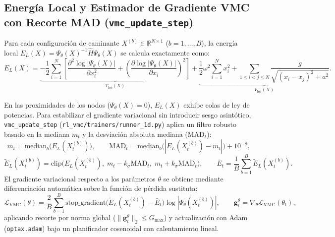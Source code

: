 \documentclass[10pt,a4paper]{article}
\begin{document}
\subsection{Energ\'ia Local y Estimador de Gradiente VMC con Recorte MAD (\texttt{vmc\_update\_step})}

Para cada configuraci\'on de caminante $X^{(b)} \in \mathbb{R}^{N \times 1}$ ($b = 1, \dots, B$), la energ\'ia local $E_L(X) = \Psi_\theta(X)^{-1}\hat{H}\Psi_\theta(X)$ se calcula exactamente como:
\begin{equation}
E_L(X) = \underbrace{-\frac{1}{2}\sum_{i=1}^{N} \left[ \frac{\partial^2 \log|\Psi_\theta(X)|}{\partial x_i^2} + \left(\frac{\partial \log|\Psi_\theta(X)|}{\partial x_i}\right)^2 \right]}_{T_{\mathrm{loc}}(X)} + \underbrace{\frac{1}{2}\omega^2 \sum_{i=1}^{N} x_i^2 + \sum_{1 \le i < j \le N} \frac{g}{\sqrt{(x_i - x_j)^2 + a^2}}}_{V_{\mathrm{loc}}(X)}.
\label{eq:local_energy}
\end{equation}

En las proximidades de los nodos ($\Psi_\theta(X) = 0$), $E_L(X)$ exhibe colas de ley de potencias. Para estabilizar el gradiente variacional sin introducir sesgo asint\'otico, \texttt{vmc\_update\_step} (\texttt{rl\_vmc/trainers/runner\_1d.py}) aplica un filtro robusto basado en la mediana $m_t$ y la desviaci\'on absoluta mediana ($\mathrm{MAD}_t$):
\begin{equation}
m_t = \mathrm{median}_b\!\big(E_L(X_t^{(b)})\big), \qquad \mathrm{MAD}_t = \mathrm{median}_b\!\big(|E_L(X_t^{(b)}) - m_t|\big) + 10^{-8},
\end{equation}
\begin{equation}
\tilde{E}_L(X_t^{(b)}) = \mathrm{clip}\!\Big(E_L(X_t^{(b)}),\; m_t - k_\sigma \mathrm{MAD}_t,\; m_t + k_\sigma \mathrm{MAD}_t\Big), \qquad \bar{E}_t = \frac{1}{B}\sum_{b=1}^{B} \tilde{E}_L(X_t^{(b)}).
\end{equation}
El gradiente variacional respecto a los par\'ametros $\theta$ se obtiene mediante diferenciaci\'on autom\'atica sobre la funci\'on de p\'erdida sustituta:
\begin{equation}
\mathcal{L}_{\mathrm{VMC}}(\theta) = \frac{2}{B}\sum_{b=1}^{B} \mathrm{stop\_gradient}\!\Big(\tilde{E}_L(X_t^{(b)}) - \bar{E}_t\Big) \log|\Psi_\theta(X_t^{(b)})|, \qquad \bm{g}_t^\theta = \nabla_\theta \mathcal{L}_{\mathrm{VMC}}(\theta_t),
\label{eq:vmc_grad}
\end{equation}
aplicando recorte por norma global ($\|\bm{g}_t^\theta\|_2 \le G_{\max}$) y actualizaci\'on con Adam (\texttt{optax.adam}) bajo un planificador cosenoidal con calentamiento lineal.
\end{document}
